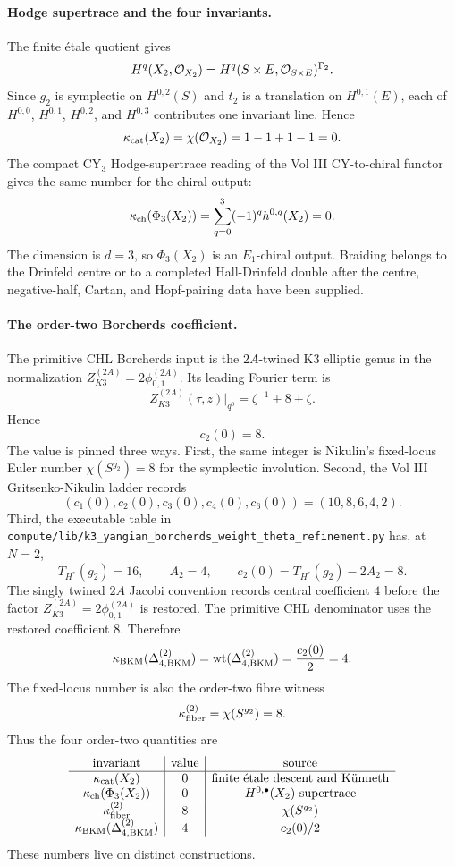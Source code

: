 \paragraph{Hodge supertrace and the four invariants.}
The finite \'{e}tale quotient gives
\[
  H^q(X_2,\mathcal{O}_{X_2})
  =
  H^q(S\times E,\mathcal{O}_{S\times E})^{\Gamma_2}.
\]
Since $g_2$ is symplectic on $H^{0,2}(S)$ and $t_2$ is a translation on
$H^{0,1}(E)$, each of
$H^{0,0}$, $H^{0,1}$, $H^{0,2}$, and $H^{0,3}$ contributes one invariant
line.  Hence
\[
  \kappa_{\mathrm{cat}}(X_2)=\chi(\mathcal{O}_{X_2})=1-1+1-1=0 .
\]
The compact CY$_3$ Hodge-supertrace reading of the Vol III
CY-to-chiral functor gives the same number for the chiral output:
\[
  \kappa_{\mathrm{ch}}(\Phi_3(X_2))=\sum_{q=0}^3(-1)^qh^{0,q}(X_2)=0 .
\]
The dimension is $d=3$, so $\Phi_3(X_2)$ is an $E_1$-chiral output.
Braiding belongs to the Drinfeld centre or to a completed
Hall-Drinfeld double after the centre, negative-half, Cartan, and
Hopf-pairing data have been supplied.

\paragraph{The order-two Borcherds coefficient.}
The primitive CHL Borcherds input is the $2A$-twined K3 elliptic genus
in the normalization $Z^{(2A)}_{K3}=2\phi^{(2A)}_{0,1}$.  Its leading
Fourier term is
\[
  Z^{(2A)}_{K3}(\tau,z)\big|_{q^0}
  =
  \zeta^{-1}+8+\zeta .
\]
Hence
\[
  c_2(0)=8 .
\]
The value is pinned three ways.  First, the same integer is Nikulin's
fixed-locus Euler number $\chi(S^{g_2})=8$ for the symplectic
involution.  Second, the Vol III Gritsenko-Nikulin ladder records
\[
  (c_1(0),c_2(0),c_3(0),c_4(0),c_6(0))
  =(10,8,6,4,2).
\]
Third, the executable table in
\texttt{compute/lib/k3\_yangian\_borcherds\_weight\_theta\_refinement.py}
has, at $N=2$,
\[
  T_{H^*}(g_2)=16,\qquad A_2=4,\qquad
  c_2(0)=T_{H^*}(g_2)-2A_2=8 .
\]
The singly twined $2A$ Jacobi convention records central coefficient
$4$ before the factor $Z^{(2A)}_{K3}=2\phi^{(2A)}_{0,1}$ is restored.
The primitive CHL denominator uses the restored coefficient $8$.
Therefore
\[
  \kappa_{\mathrm{BKM}}(\Delta^{(2)}_{4,\mathrm{BKM}})
  =
  \mathrm{wt}(\Delta^{(2)}_{4,\mathrm{BKM}})
  =
  \frac{c_2(0)}{2}
  =
  4 .
\]
The fixed-locus number is also the order-two fibre witness
\[
  \kappa_{\mathrm{fiber}}^{(2)}=\chi(S^{g_2})=8 .
\]
Thus the four order-two quantities are
\[
\begin{array}{c|c|c}
\hbox{invariant} & \hbox{value} & \hbox{source}\\ \hline
\kappa_{\mathrm{cat}}(X_2) & 0 & \hbox{finite \'{e}tale descent and K\"unneth}\\
\kappa_{\mathrm{ch}}(\Phi_3(X_2)) & 0 & H^{0,\bullet}(X_2)\ \hbox{supertrace}\\
\kappa_{\mathrm{fiber}}^{(2)} & 8 & \chi(S^{g_2})\\
\kappa_{\mathrm{BKM}}(\Delta^{(2)}_{4,\mathrm{BKM}}) & 4 & c_2(0)/2
\end{array}
\]
These numbers live on distinct constructions.


